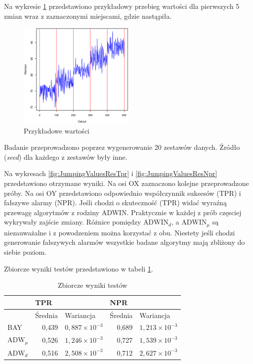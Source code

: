 Na wykresie \ref{fig:JumpingValues} przedstawiono przykładowy przebieg wartości dla pierwszych 5 zmian
wraz z zaznaczonymi miejscami,
gdzie nastąpiła.
\begin{figure}[htbp]
  \centering
  \includegraphics[width=0.5\textwidth]{img/ch-5-jumping}
  \caption{Przykładowe wartości}
  \label{fig:JumpingValues}
\end{figure}
Badanie przeprowadzono poprzez wygenerowanie 20 zestawów danych.
Źródło (\textit{seed}) dla każdego z zestawów były inne.

Na wykresach \ref{fig:JumpingValuesResTpr} i \ref{fig:JumpingValuesResNpr} przedstawiono otrzymane wyniki.
Na osi OX zaznaczono kolejne przeprowadzone próby.
Na osi OY przedstawiono odpowiednio współczynnik suksesów (TPR) i fałszywe alarmy (NPR).
Jeśli chodzi o skuteczność (TPR) widać wyraźną przewagę algorytmów z rodziny ADWIN.
Praktycznie w każdej z prób częsciej wykrywały zajście zmiany.
Różnice pomiędzy $\mbox{ADWIN}_d$,
a $\mbox{ADWIN}_{\mu}$ są niezauważalne i z powodzeniem można korzystać z obu.
Niestety jeśli chodzi generowanie fałszywych alarmów wszystkie badane algorytmy
mają zbliżony do siebie poziom.

Zbiorcze wyniki testów przedstawiono w tabeli \ref{tab:JumpingResult}.
\begin{table}[h]
  \label{tab:JumpingResult}
  \centering
  \begin{tabular}{l r r r r}
    & \multicolumn{2}{l}{TPR} & \multicolumn{2}{l}{NPR} \\
    \hline
    & \multicolumn{1}{l}{Średnia} & \multicolumn{1}{l}{Wariancja}& \multicolumn{1}{l}{Średnia} & \multicolumn{1}{l}{Wariancja} \\
    \hline
    BAY & 0,439 & $0,887 \times 10^{-3}$ & 0,689 & $1,213 \times 10^{-3}$  \\
    $\mbox{ADW}_{\mu}$ & 0,526 & $1,246 \times 10^{-3}$ & 0,727 & $1,539 \times 10^{-3}$ \\
    $\mbox{ADW}_{d}$ & 0,516 & $2,508 \times 10^{-3}$ & 0,712 & $2,627 \times 10^{-3}$ \\
  \end{tabular}
  \caption{Zbiorcze wyniki testów}
\end{table}

